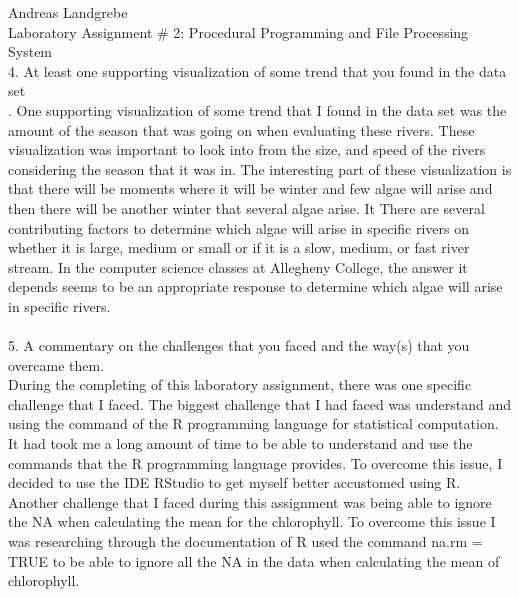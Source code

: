 \documentclass{article}
\begin{document}
\noindent
Andreas Landgrebe
\\
Laboratory Assignment \# 2: Procedural Programming and File Processing System
\\
4. At least one supporting visualization of some trend that you found in the data set
\\.
One supporting visualization of some trend that I found in the data set was the amount of the season that was going on when evaluating these rivers. These visualization was important to look into from the size, and speed of the rivers considering the season that it was in. The interesting part of these visualization is that there will be moments where it will be winter and few algae will arise and then there will be another winter that several algae arise. It There are several contributing factors to determine which algae will arise in specific rivers on whether it is large, medium or small or if it is a slow, medium, or fast river stream. In the computer science classes at Allegheny College, the answer it depends seems to be an appropriate response to determine which algae will arise in specific rivers.
\\
\\
5. A commentary on the challenges that you faced and the way(s) that you overcame them.
\\
During the completing of this laboratory assignment, there was one specific challenge that I faced. The biggest challenge that I had faced was understand and using the command of the R programming language for statistical computation. It had took me a long amount of time to be able to understand and use the commands that the R programming language provides. To overcome this issue, I decided to use the IDE RStudio to get myself better accustomed using R. Another challenge that I faced during this assignment was being able to ignore the NA when calculating the mean for the chlorophyll. To overcome this issue I was researching through the documentation of R used the command na.rm = TRUE to be able to ignore all the NA in the data when calculating the mean of chlorophyll.
\end{document}
